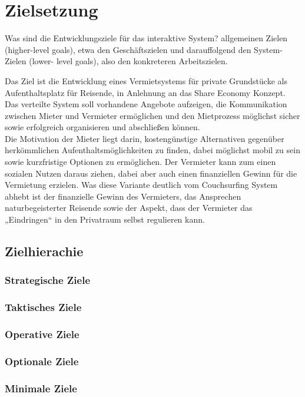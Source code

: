 
\section{Zielsetzung}
Was sind die Entwicklungsziele für das interaktive System?
allgemeinen Zielen (higher-level goals), etwa den Geschäftszielen und darauffolgend  
den System-Zielen (lower- level goals), also den konkreteren Arbeitszielen.
 
Das Ziel ist die Entwicklung eines Vermietsystems für private Grundstücke als Aufenthaltsplatz für Reisende, in Anlehnung an das Share Economy Konzept.\\
Das verteilte System soll vorhandene Angebote aufzeigen, die Kommunikation zwischen Mieter und Vermieter ermöglichen und den Mietprozess möglichst sicher sowie erfolgreich organisieren und abschließen können.\\
Die Motivation der Mieter liegt darin, kostengünstige Alternativen gegenüber herkömmlichen Aufenthaltsmöglichkeiten zu finden, dabei möglichst mobil zu sein sowie kurzfristige Optionen zu ermöglichen. Der Vermieter kann zum einen sozialen Nutzen daraus ziehen, dabei aber auch einen finanziellen Gewinn für die Vermietung erzielen. Was diese Variante deutlich vom Couchsurfing System abhebt ist der finanzielle Gewinn des Vermieters, das Ansprechen naturbegeisterter Reisende sowie der Aspekt, dass der Vermieter das „Eindringen“ in den Privatraum selbst regulieren kann.
 
\subsection{Zielhierachie}

\subsubsection{Strategische Ziele}
\subsubsection{Taktisches Ziele}
\subsubsection{Operative Ziele}
\subsubsection{Optionale Ziele}
\subsubsection{Minimale Ziele}

